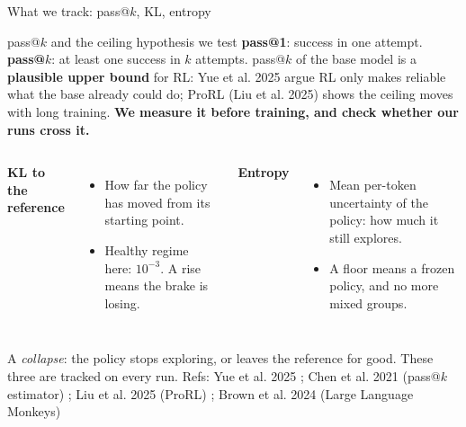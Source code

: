 \documentclass[aspectratio=169,10pt]{beamer}
\newcommand{\refs}[1]{\vfill{\tiny\textcolor{crMid}{Refs: #1}}}
\newcommand{\hl}[1]{\textcolor{crOrange}{\textbf{#1}}}
\begin{document}
\begin{frame}{What we track: pass@$k$, KL, entropy}
\small
\begin{block}{pass@$k$ and the ceiling hypothesis we test}
\textbf{pass@1}: success in one attempt. \textbf{pass@$k$}: at least one success in $k$ attempts. pass@$k$ of the base model is a \textbf{plausible upper bound} for RL: Yue et al. 2025 argue RL only makes reliable what the base already could do; ProRL (Liu et al. 2025) shows the ceiling moves with long training. \hl{We measure it before training, and check whether our runs cross it.}
\end{block}
\vspace{0.15cm}
\begin{columns}[T]
\textbf{KL to the reference}
\begin{itemize}
  \item How far the policy has moved from its starting point.
  \item Healthy regime here: $10^{-3}$. A rise means the brake is losing.
\end{itemize}
\textbf{Entropy}
\begin{itemize}
  \item Mean per-token uncertainty of the policy: how much it still explores.
  \item A floor means a frozen policy, and no more mixed groups.
\end{itemize}
\end{columns}
\vspace{0.15cm}
\footnotesize A \emph{collapse}: the policy stops exploring, or leaves the reference for good. These three are tracked on every run.
\refs{Yue et al. 2025 ; Chen et al. 2021 (pass@$k$ estimator) ; Liu et al. 2025 (ProRL) ; Brown et al. 2024 (Large Language Monkeys)}
\end{frame}
\end{document}
